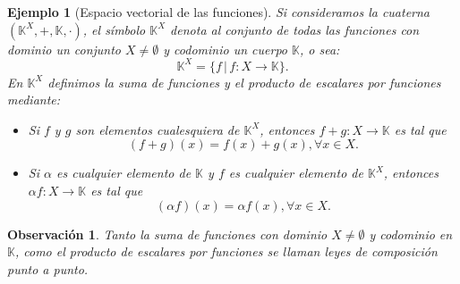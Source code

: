 \documentclass[b5paper, 11pt]{book}
\newcommand{\0}{\mathbf{0}}
\newcommand{\K}{\mathds{K}}
\newtheorem{obs}{Observación}[chapter]
\theoremstyle{estiloB}
\newtheorem{ejemg}{Ejemplo}[chapter]
\theoremstyle{estiloC}
\theoremstyle{estiloD}
\begin{document}
\begin{ejemg}[Espacio vectorial de las funciones]\label{ev.f}
Si consideramos la cuaterna $(\K^{X}, +, \K, \cdot)$, el símbolo $\K^{X}$ denota al conjunto de todas las funciones con dominio un conjunto $X \neq \emptyset$ y codominio un cuerpo $\K$, o sea:
\[ \K^{X}= \{ f \,|\, f: X \to \K \}. \]
En $\K^{X}$ definimos la suma de funciones y el producto de escalares por funciones mediante: 

\begin{itemize}
\item[\textit{i)}] Si $f$ y $g$ son elementos cualesquiera de $\K^{X}$, entonces $f+g: X \to \K$ es tal que
\[ (f+g)(x)= f(x)+ g(x), \forall x \in X.\]

\item[\textit{ii)}] Si $\alpha$ es cualquier elemento de $\K$ y $f$ es cualquier elemento de $\K^{X}$, entonces $\alpha f: X \to \K$ es tal que
\[ (\alpha f)(x)= \alpha f(x), \forall x \in X. \]
\end{itemize}
\end{ejemg}

\begin{obs}
Tanto la suma de funciones con dominio $X \neq \emptyset$ y codominio en $\K$, como el producto de escalares por funciones se llaman leyes de composición punto a punto.
\end{obs}
\end{document}
